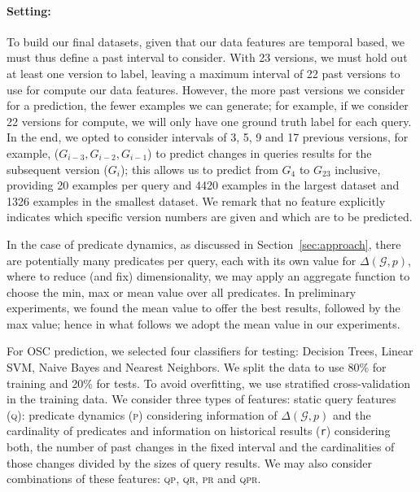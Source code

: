 \documentclass[runningheads]{llncs}
\begin{document}
\paragraph{Setting:} To build our final datasets, given that our data features are temporal based, we must thus define a past interval to consider. With 23 versions, we must hold out at least one version to label, leaving a maximum interval of 22 past versions to use for compute our data features. However, the more past versions we consider for a prediction, the fewer examples we can generate; for example, if we consider 22 versions for compute, we will only have one ground truth label for each query. In the end, we opted to consider intervals of 3, 5, 9 and 17 previous versions, for example, ($G_{i-3}, G_{i-2}, G_{i-1}$) to predict changes in queries results for the subsequent version ($G_i$); this allows us to predict from $G_4$ to $G_{23}$ inclusive, providing 20 examples per query and 4420 examples in the largest dataset and 1326 examples in the smallest dataset. We remark that no feature explicitly indicates which specific version numbers are given and which are to be predicted.

In the case of predicate dynamics, as discussed in Section~\ref{sec:approach}, there are potentially many predicates per query, each with its own value for $\Delta(\mathcal{G},p)$, where to reduce (and fix) dimensionality, we may apply an aggregate function to choose the min, max or mean value over all predicates. In preliminary experiments, we found the mean value to offer the best results, followed by the max value; hence in what follows we adopt the mean value in our experiments.

For OSC prediction, we selected four classifiers for testing: Decision Trees, Linear SVM, Naive Bayes and Nearest Neighbors. We split the data to use 80\% for training and 20\% for tests. To avoid overfitting, we use stratified cross-validation in the training data. We consider three types of features: static query features (\textsc{q}): predicate dynamics (\textsc{p}) considering information of $\Delta(\mathcal{G},p)$ and the cardinality of predicates and information on historical results (\texttt{r}) considering both, the number of past changes in the fixed interval and the cardinalities of those changes divided by the sizes of query results. We may also consider combinations of these features: \textsc{qp}, \textsc{qr}, \textsc{pr} and \textsc{qpr}.


\end{document}
